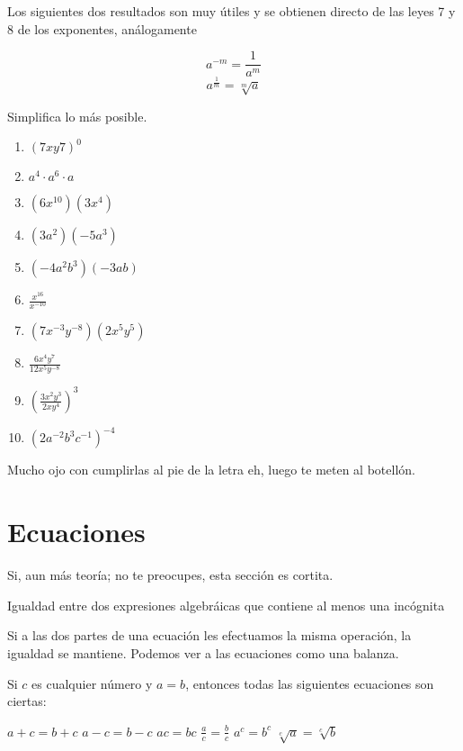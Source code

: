 Los siguientes dos resultados son muy útiles y se obtienen 
directo de las leyes 7 y 8 de los exponentes, análogamente

\[a^{-m} = \frac{1}{a^m}\]
\[a^{\frac{1}{m}} = \sqrt[m]{a}\]

\begin{exercise}
    Simplifica lo más posible.

    \begin{enumerate}
        \item $(7x y7)^0$
        \item $a^4 \cdot a^6 \cdot a$
        \item $(6x^{10})(3x^4)$
        \item $(3a^2)(-5a^3)$
        \item $(-4a^2 b^3)(-3ab)$
        \item $\frac{x^{16}}{x^{-10}}$
        \item $(7x^{-3}y^{-8})(2x^5y^5)$
        \item $\frac{6x^4y^7}{12x^5y^{-8}}$
        \item $\left(\frac{3x^2y^3}{2xy^4}\right)^3$
        \item $\left(2a^{-2}b^3c^{-1}\right)^{-4}$
    \end{enumerate}
\end{exercise}

Mucho ojo con cumplirlas al pie de la letra eh, luego te meten 
al botellón.

\section{Ecuaciones}

Si, aun más teoría; no te preocupes, esta sección 
es cortita.

\begin{definition}[Ecuación]
    Igualdad entre dos expresiones algebráicas que contiene 
    al menos una incógnita
\end{definition}

Si a las dos partes de una ecuación les efectuamos la misma 
operación, la igualdad se mantiene. Podemos ver a las 
ecuaciones como una balanza.

Si $c$ es cualquier número y $a=b$, entonces todas las 
siguientes ecuaciones son ciertas:

\begin{enumerate}
    \ii $a+c=b+c$
    \ii $a-c=b-c$
    \ii $ac = bc$
    \ii $\frac{a}{c} = \frac{b}{c}$
    \ii $a^c = b^c$
    \ii $\sqrt[c]{a}= \sqrt[c]{b}$
\end{enumerate}


